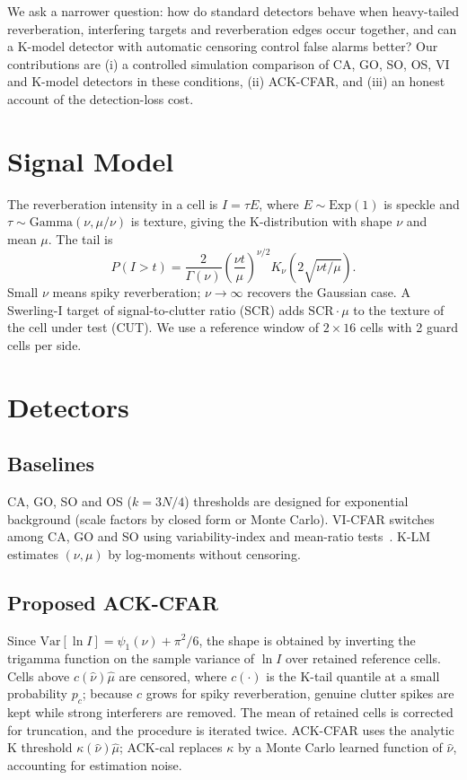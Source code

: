\documentclass[conference]{IEEEtran}
\begin{document}
We ask a narrower question: how do standard detectors behave when heavy-tailed reverberation, interfering targets and reverberation edges occur together, and can a K-model detector with automatic censoring control false alarms better? Our contributions are (i) a controlled simulation comparison of CA, GO, SO, OS, VI and K-model detectors in these conditions, (ii) ACK-CFAR, and (iii) an honest account of the detection-loss cost.

\section{Signal Model}
The reverberation intensity in a cell is $I=\tau E$, where $E\sim\mathrm{Exp}(1)$ is speckle and $\tau\sim\mathrm{Gamma}(\nu,\mu/\nu)$ is texture, giving the K-distribution with shape $\nu$ and mean $\mu$. The tail is
\begin{equation}
P(I>t)=\frac{2}{\Gamma(\nu)}\left(\frac{\nu t}{\mu}\right)^{\nu/2}K_\nu\!\left(2\sqrt{\nu t/\mu}\right).
\end{equation}
Small $\nu$ means spiky reverberation; $\nu\to\infty$ recovers the Gaussian case. A Swerling-I target of signal-to-clutter ratio (SCR) adds $\mathrm{SCR}\cdot\mu$ to the texture of the cell under test (CUT). We use a reference window of $2\times16$ cells with 2 guard cells per side.

\section{Detectors}
\subsection{Baselines}
CA, GO, SO and OS ($k=3N/4$) thresholds are designed for exponential background (scale factors by closed form or Monte Carlo). VI-CFAR switches among CA, GO and SO using variability-index and mean-ratio tests~\cite{smith2000}. K-LM estimates $(\nu,\mu)$ by log-moments without censoring.

\subsection{Proposed ACK-CFAR}
Since $\mathrm{Var}[\ln I]=\psi_1(\nu)+\pi^2/6$, the shape is obtained by inverting the trigamma function on the sample variance of $\ln I$ over retained reference cells. Cells above $c(\hat\nu)\hat\mu$ are censored, where $c(\cdot)$ is the K-tail quantile at a small probability $p_c$; because $c$ grows for spiky reverberation, genuine clutter spikes are kept while strong interferers are removed. The mean of retained cells is corrected for truncation, and the procedure is iterated twice. ACK-CFAR uses the analytic K threshold $\kappa(\hat\nu)\hat\mu$; ACK-cal replaces $\kappa$ by a Monte Carlo learned function of $\hat\nu$, accounting for estimation noise.
\end{document}

